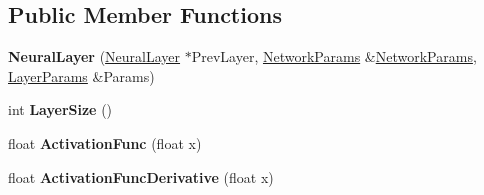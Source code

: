 \subsection*{Public Member Functions}
\begin{DoxyCompactItemize}
\item 
{\bfseries Neural\+Layer} (\hyperlink{class_neural_layer}{Neural\+Layer} $\ast$Prev\+Layer, \hyperlink{struct_perceptron_1_1_network_params}{Network\+Params} \&\hyperlink{struct_perceptron_1_1_network_params}{Network\+Params}, \hyperlink{struct_perceptron_1_1_layer_params}{Layer\+Params} \&Params)\hypertarget{class_neural_layer_a33736379abd178ba2ab394ad39a2e284}{}\label{class_neural_layer_a33736379abd178ba2ab394ad39a2e284}

\item 
int {\bfseries Layer\+Size} ()\hypertarget{class_neural_layer_a4d000e0a192aa8f22f04762b7d208357}{}\label{class_neural_layer_a4d000e0a192aa8f22f04762b7d208357}

\item 
float {\bfseries Activation\+Func} (float x)\hypertarget{class_neural_layer_a3e565a98ae1d7353795575f575de1830}{}\label{class_neural_layer_a3e565a98ae1d7353795575f575de1830}

\item 
float {\bfseries Activation\+Func\+Derivative} (float x)\hypertarget{class_neural_layer_af2c164486c9757912f72ff06ab976d39}{}\label{class_neural_layer_af2c164486c9757912f72ff06ab976d39}

\end{DoxyCompactItemize}
